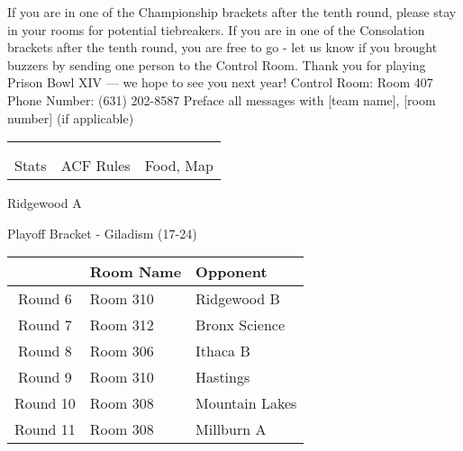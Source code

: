\documentclass{article}%
\begin{document}
\vspace*{30pt}%
\linebreak%
If you are in one of the Championship brackets after the tenth round, please stay in your rooms for potential tiebreakers.\newline%
\newline%
If you are in one of the Consolation brackets after the tenth round, you are free to go {-} let us know if you brought buzzers by sending one person to the Control Room.\newline%
\newline%
Thank you for playing Prison Bowl XIV — we hope to see you next year!\newline%
\newline%
Control Room: Room 407\newline%
Phone Number: (631) 202{-}8587\newline%
Preface all messages with {[}team name{]}, {[}room number{]} (if applicable)%
\vspace*{30pt}%
\newline%
%
\begin{tabularx}{\textwidth}{YYY}%
  &  &  \\%
\\%
Stats&ACF Rules&Food, Map\\%
\end{tabularx}%
\newpage%
\begin{center}%
\begin{Huge}%
Ridgewood A%
\end{Huge}%
\vspace*{12pt}%
\linebreak%
\begin{Large}%
Playoff Bracket {-} Giladism (17{-}24)%
\end{Large}%
\end{center}%
\vspace*{4pt}%
%
\begin{tabularx}{\textwidth}{|c|Y|Y|}%
\hline%
&Room Name&Opponent\\%
\hline%
Round 6&Room 310&Ridgewood B\\%
Round 7&Room 312&Bronx Science\\%
Round 8&Room 306&Ithaca B\\%
Round 9&Room 310&Hastings\\%
Round 10&Room 308&Mountain Lakes\\%
Round 11&Room 308&Millburn A\\%
\hline%
\end{tabularx}%
\end{document}

